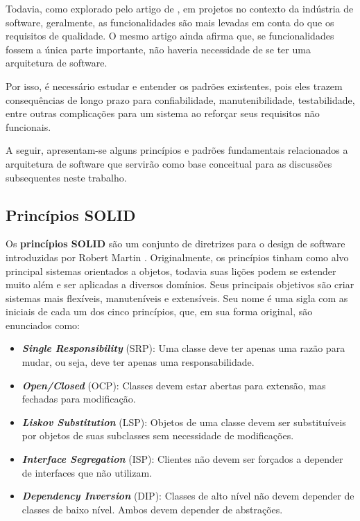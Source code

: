 Todavia, como explorado pelo artigo de \cite{kassab2018architectural}, em projetos no contexto da indústria de software, geralmente, as funcionalidades são mais levadas em conta do que os requisitos de qualidade. O mesmo artigo ainda afirma que, se funcionalidades fossem a única parte importante, não haveria necessidade de se ter uma arquitetura de software.

Por isso, é necessário estudar e entender os padrões existentes, pois eles trazem consequências de longo prazo para confiabilidade, manutenibilidade, testabilidade, entre outras complicações para um sistema ao reforçar seus requisitos não funcionais.

A seguir, apresentam-se alguns princípios e padrões fundamentais relacionados a arquitetura de software que servirão como base conceitual para as discussões subsequentes neste trabalho.

\subsection{Princípios SOLID}

Os \textbf{princípios SOLID} são um conjunto de diretrizes para o design de software introduzidas por Robert Martin \citep{martin2000design}. Originalmente, os princípios tinham como alvo principal sistemas orientados a objetos, todavia suas lições podem se estender muito além e ser aplicadas a diversos domínios. Seus principais objetivos são criar sistemas mais flexíveis, manuteníveis e extensíveis. Seu nome é uma sigla com as iniciais de cada um dos cinco princípios, que, em sua forma original, são enunciados como:

\begin{itemize}
    \item \textit{\textbf{Single Responsibility}} (SRP): Uma classe deve ter apenas uma razão para mudar, ou seja, deve ter apenas uma responsabilidade.
    
    \item \textit{\textbf{Open/Closed}} (OCP): Classes devem estar abertas para extensão, mas fechadas para modificação.
    
    \item \textit{\textbf{Liskov Substitution}} (LSP): Objetos de uma classe devem ser substituíveis por objetos de suas subclasses sem necessidade de modificações.
    
    \item \textit{\textbf{Interface Segregation}} (ISP): Clientes não devem ser forçados a depender de interfaces que não utilizam.
    
    \item \textit{\textbf{Dependency Inversion}} (DIP): Classes de alto nível não devem depender de classes de baixo nível. Ambos devem depender de abstrações.
\end{itemize}


